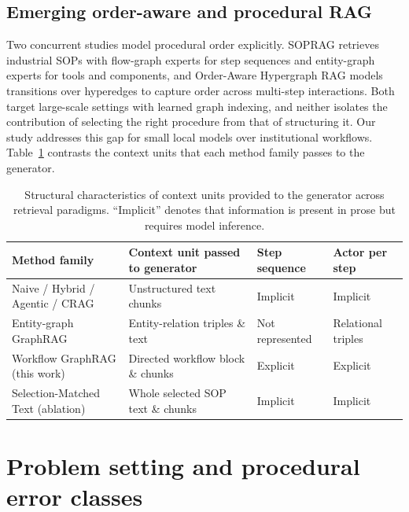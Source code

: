 \documentclass[preprint,10pt]{elsarticle}
\begin{document}
\subsection{Emerging order-aware and procedural RAG}
Two concurrent studies model procedural order explicitly. SOPRAG \cite{lin2026sedrag} retrieves industrial SOPs with flow-graph experts for step sequences and entity-graph experts for tools and components, and Order-Aware Hypergraph RAG \cite{wu2026okhrag} models transitions over hyperedges to capture order across multi-step interactions. Both target large-scale settings with learned graph indexing, and neither isolates the contribution of selecting the right procedure from that of structuring it. Our study addresses this gap for small local models over institutional workflows. Table~\ref{tab:positioning} contrasts the context units that each method family passes to the generator.

\begin{table}[!htbp]
\centering
\caption{Structural characteristics of context units provided to the generator across retrieval paradigms. ``Implicit'' denotes that information is present in prose but requires model inference.}
\label{tab:positioning}
\small
\begin{tabularx}{\textwidth}{>{\raggedright\arraybackslash}p{3.2cm} >{\raggedright\arraybackslash}X >{\raggedright\arraybackslash}p{2.1cm} >{\raggedright\arraybackslash}p{2.1cm}}
\toprule
Method family & Context unit passed to generator & Step sequence & Actor per step \\
\midrule
Naive / Hybrid / Agentic / CRAG \cite{lewis2020rag,cormack2009rrf,yao2023react,yan2024crag} & Unstructured text chunks & Implicit & Implicit \\
Entity-graph GraphRAG \cite{edge2024graphrag,guo2024lightrag} & Entity-relation triples \& text & Not represented & Relational triples \\
Workflow GraphRAG (this work) & Directed workflow block \& chunks & Explicit & Explicit \\
Selection-Matched Text (ablation) & Whole selected SOP text \& chunks & Implicit & Implicit \\
\bottomrule
\end{tabularx}
\end{table}

\section{Problem setting and procedural error classes}
\label{sec:problem}
\end{document}
